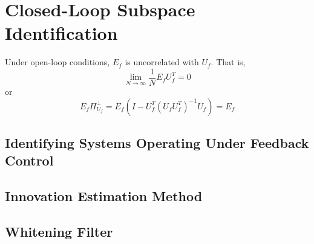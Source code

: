 \section{Closed-Loop Subspace Identification}

Under open-loop conditions, $E_f$ is uncorrelated with $U_f$. That is,
\begin{equation*}
\lim_{N\rightarrow\infty}\frac{1}{N}E_fU_f^T =0
\end{equation*}
or 
\begin{equation*}
E_f \Pi_{U_f}^\perp = E_f(I-U_f^T(U_fU_f^T)^{-1}U_f) = E_f
\end{equation*}

\subsection{Identifying Systems Operating Under Feedback Control}

\subsection{Innovation Estimation Method}

\subsection{Whitening Filter}